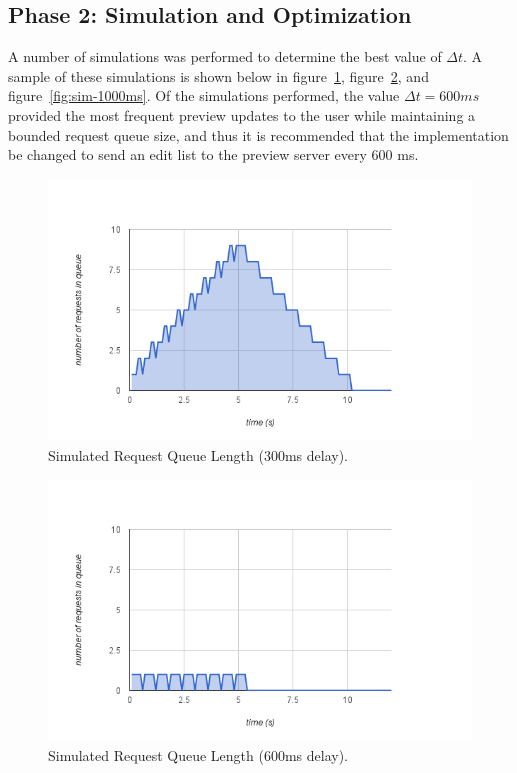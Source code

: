\documentclass[se,resubmit]{uw-wkrpt}
\begin{document}
\subsection{Phase 2: Simulation and Optimization}
A number of
simulations was performed to determine the best value of $\Delta t$. A
sample of these simulations is shown below in figure~\ref{fig:sim-300ms},
figure~\ref{fig:sim-600ms}, and figure~\ref{fig:sim-1000ms}. Of the
simulations performed, the value $\Delta t=600 ms$ provided the most
frequent preview updates to the user while maintaining a bounded request
queue size, and thus it is recommended that the implementation be changed
to send an edit list to the preview server every 600 ms.
\begin{figure}
  \centering
  \includegraphics[width=6.25in]{sim-300ms}
  \caption{Simulated Request Queue Length (300ms delay).}
  \label{fig:sim-300ms}
\end{figure}

\begin{figure}
  \centering
  \includegraphics[width=6.25in]{sim-600ms}
  \caption{Simulated Request Queue Length (600ms delay).}
  \label{fig:sim-600ms}
\end{figure}
\end{document}
